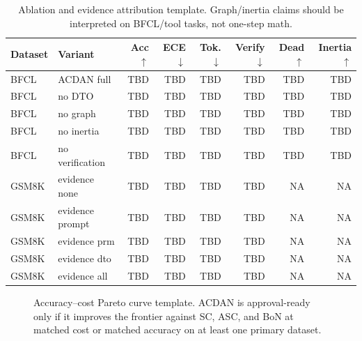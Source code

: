 \documentclass[letterpaper]{article} %
\begin{document}
\begin{table}[t]
\centering
\caption{Ablation and evidence attribution template. Graph/inertia claims should
be interpreted on BFCL/tool tasks, not one-step math.}
\label{tab:ablation}
\begin{tabular}{@{}llrrrrrr@{}}
\toprule
Dataset & Variant & Acc$\uparrow$ & ECE$\downarrow$ & Tok.$\downarrow$ & Verify$\downarrow$ & Dead$\uparrow$ & Inertia$\uparrow$ \\
\midrule
BFCL & ACDAN full & TBD & TBD & TBD & TBD & TBD & TBD \\
BFCL & no DTO & TBD & TBD & TBD & TBD & TBD & TBD \\
BFCL & no graph & TBD & TBD & TBD & TBD & TBD & TBD \\
BFCL & no inertia & TBD & TBD & TBD & TBD & TBD & TBD \\
BFCL & no verification & TBD & TBD & TBD & TBD & TBD & TBD \\
GSM8K & evidence none & TBD & TBD & TBD & TBD & NA & NA \\
GSM8K & evidence prompt & TBD & TBD & TBD & TBD & NA & NA \\
GSM8K & evidence prm & TBD & TBD & TBD & TBD & NA & NA \\
GSM8K & evidence dto & TBD & TBD & TBD & TBD & NA & NA \\
GSM8K & evidence all & TBD & TBD & TBD & TBD & NA & NA \\
\bottomrule
\end{tabular}
\end{table}

\begin{figure}[t]
\centering
{}
\caption{Accuracy--cost Pareto curve template. ACDAN is approval-ready only if
it improves the frontier against SC, ASC, and BoN at matched cost or matched
accuracy on at least one primary dataset.}
\label{fig:pareto}
\end{figure}
\end{document}
